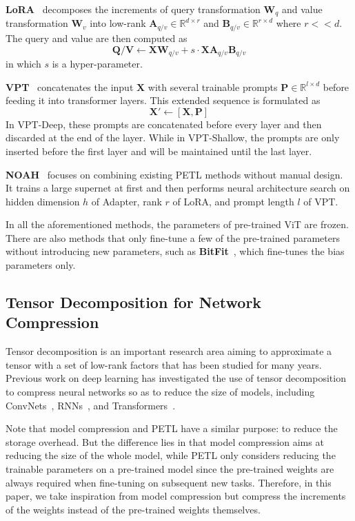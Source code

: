 \textbf{LoRA}~\cite{lora} decomposes the increments of query transformation $\boldsymbol{W}_{q}$ and value transformation $\boldsymbol{W}_{v}$ into low-rank $\boldsymbol{A}_{q/v}\in \mathbb{R}^{d\times r}$ and $\boldsymbol{B}_{q/v}\in \mathbb{R}^{r\times d}$ where $r << d$. The query and value are then computed as 
$$\boldsymbol{Q/V}\leftarrow\boldsymbol{XW}_{q/v}+s\cdot\boldsymbol{XA}_{q/v}\boldsymbol{B}_{q/v}$$
in which $s$ is a hyper-parameter.

\textbf{VPT}~\cite{vpt} concatenates the input $\boldsymbol{X}$ with several trainable prompts $\boldsymbol{P}\in \mathbb{R}^{l\times d}$ before feeding it into transformer layers. This extended sequence is formulated as
$$\boldsymbol{X}'\leftarrow[\boldsymbol{X}, \boldsymbol{P}]$$
In VPT-Deep, these prompts are concatenated before every layer and then discarded at the end of the layer. While in VPT-Shallow, the prompts are only inserted before the first layer and will be maintained until the last layer.

\textbf{NOAH}~\cite{noah} focuses on combining existing PETL methods without manual design. It trains a large supernet at first and then performs neural architecture search on hidden dimension $h$ of Adapter, rank $r$ of LoRA, and prompt length $l$ of VPT.

In all the aforementioned methods, the parameters of pre-trained ViT are frozen. There are also methods that only fine-tune a few of the pre-trained parameters without introducing new parameters, such as \textbf{BitFit}~\cite{bitfit}, which fine-tunes the bias parameters only. 

\subsection{Tensor Decomposition for Network Compression} Tensor decomposition is an important research area aiming to approximate a tensor with a set of low-rank factors that has been studied for many years. Previous work on deep learning has investigated the use of tensor decomposition to compress neural networks so as to reduce the size of models, including ConvNets~\cite{com_cnn1,com_cnn2}, RNNs~\cite{com_rnn1,com_rnn2,com_rnn3}, and Transformers~\cite{intra1,inter1}.

Note that model compression and PETL have a similar purpose: to reduce the storage overhead. But the difference lies in that model compression aims at reducing the size of the whole model, while PETL only considers reducing the trainable parameters on a pre-trained model since the pre-trained weights are always required when fine-tuning on subsequent new tasks. Therefore, in this paper, we take inspiration from model compression but compress the increments of the weights instead of the pre-trained weights themselves.

